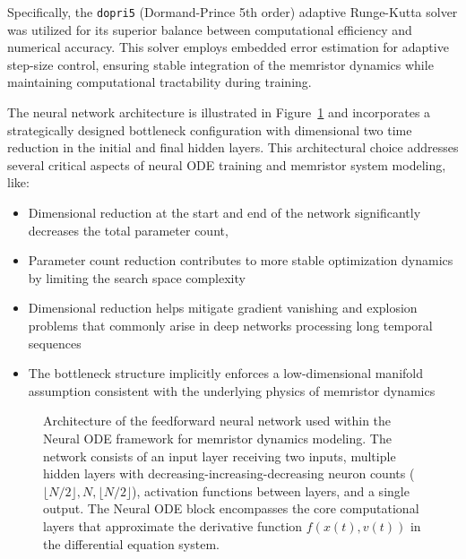 \documentclass[lettersize,journal]{IEEEtran}
\newcommand{\ua}{v}
\newcommand{\xw}{x}
\begin{document}
Specifically, the \texttt{dopri5} (Dormand-Prince 5th order) adaptive Runge-Kutta solver was utilized for its superior balance between computational efficiency and numerical accuracy. This solver employs embedded error estimation for adaptive step-size control, ensuring stable integration of the memristor dynamics while maintaining computational tractability during training.

The neural network architecture is illustrated in Figure~\ref{fig:nn-arch} and incorporates a strategically designed bottleneck configuration with dimensional two time reduction in the initial and final hidden layers. This architectural choice addresses several critical aspects of neural ODE training and memristor system modeling, like:
\begin{itemize}
  \item Dimensional reduction at the start and end of the network significantly decreases the total parameter count,
  \item  Parameter count reduction contributes to more stable optimization dynamics by limiting the search space complexity
  \item Dimensional reduction helps mitigate gradient vanishing and explosion problems that commonly arise in deep networks processing long temporal sequences
  \item  The bottleneck structure implicitly enforces a low-dimensional manifold assumption consistent with the underlying physics of memristor dynamics
\end{itemize}


\begin{figure}[ht!]
  \centering
  \resizebox{2in}{!}{%
    
  }
  \caption{Architecture of the feedforward neural network used within the Neural ODE framework for memristor dynamics modeling. The network consists of an input layer receiving two inputs, multiple hidden layers with decreasing-increasing-decreasing neuron counts (\(\lfloor N/2 \rfloor, N, \lfloor N/2 \rfloor\)), activation functions between layers, and a single output. The Neural ODE block encompasses the core computational layers that approximate the derivative function \(f(\xw(t), \ua(t))\) in the differential equation system.}

  \label{fig:nn-arch}
\end{figure}
\end{document}
